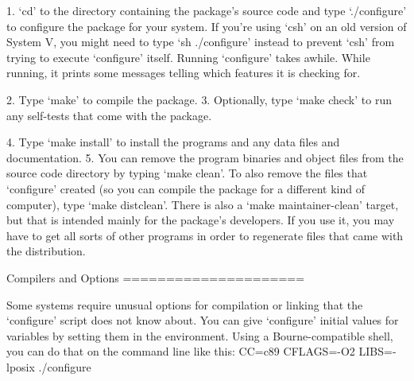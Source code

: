 \begin{DoxyCodeInclude}
\textcolor{stringliteral}{}
\textcolor{stringliteral}{  1. `cd'} to the directory containing the package\textcolor{stringliteral}{'s source code and type}
\textcolor{stringliteral}{     `./configure'} to configure the package \textcolor{keywordflow}{for} your system.  If you\textcolor{stringliteral}{'re}
\textcolor{stringliteral}{     using `csh'} on an old version of System V, you might need to type
     `sh ./configure\textcolor{stringliteral}{' instead to prevent `csh'} from trying to execute
     `configure\textcolor{stringliteral}{' itself.}
\textcolor{stringliteral}{}
\textcolor{stringliteral}{     Running `configure'} takes awhile.  While running, it prints some
     messages telling which features it is checking \textcolor{keywordflow}{for}.

  2. Type `make\textcolor{stringliteral}{' to compile the package.}
\textcolor{stringliteral}{}
\textcolor{stringliteral}{  3. Optionally, type `make check'} to run any \textcolor{keyword}{self}-tests that come with
     the package.

  4. Type `make install\textcolor{stringliteral}{' to install the programs and any data files and}
\textcolor{stringliteral}{     documentation.}
\textcolor{stringliteral}{}
\textcolor{stringliteral}{  5. You can remove the program binaries and object files from the}
\textcolor{stringliteral}{     source code directory by typing `make clean'}.  To also \textcolor{keyword}{remove} the
     files that `configure\textcolor{stringliteral}{' created (so you can compile the package for}
\textcolor{stringliteral}{     a different kind of computer), type `make distclean'}.  There is
     also a `make maintainer-clean\textcolor{stringliteral}{' target, but that is intended mainly}
\textcolor{stringliteral}{     for the package'}s developers.  If you use it, you may have to \textcolor{keyword}{get}
     all sorts of other programs in order to regenerate files that came
     with the distribution.

Compilers and Options
=====================

   Some systems require unusual options \textcolor{keywordflow}{for} compilation or linking that
the `configure\textcolor{stringliteral}{' script does not know about.  You can give `configure'}
initial values \textcolor{keywordflow}{for} variables by setting them in the environment.  Using
a Bourne-compatible shell, you can \textcolor{keywordflow}{do} that on the command line like
\textcolor{keyword}{this}:
     CC=c89 CFLAGS=-O2 LIBS=-lposix ./configure


\end{DoxyCodeInclude}
